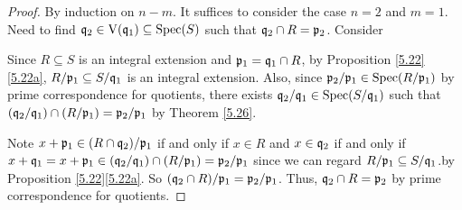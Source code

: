 \begin{proof}
    By induction on $n-m$. It suffices to consider the case $n = 2$ and $m = 1$. Need to find $\mathfrak{q}_2 \in \operatorname{V}(\mathfrak{q}_1) \subseteq \operatorname{Spec}(S)$ such that $\mathfrak{q}_2 \cap R = \mathfrak{p}_2$. Consider
    \begin{center}
    \end{center}
    Since $R \subseteq S$ is an integral extension and $\mathfrak{p}_1 = \mathfrak{q}_1 \cap R$, by Proposition \ref{5.22}\ref{5.22a}, $R/\mathfrak{p}_1 \subseteq S/\mathfrak{q}_1$ is an integral extension. Also, since $\mathfrak{p}_2/\mathfrak{p}_1 \in \operatorname{Spec}(R/\mathfrak{p}_1)$ by prime correspondence for quotients, there exists $\mathfrak{q}_2/\mathfrak{q}_1 \in \operatorname{Spec}(S/\mathfrak{q}_1)$ such that $(\mathfrak{q}_2/\mathfrak{q}_1) \cap (R/\mathfrak{p}_1) = \mathfrak{p}_2/\mathfrak{p}_1$ by Theorem \ref{5.26}. \par 
    Note $x + \mathfrak{p}_1 \in (R \cap \mathfrak{q}_2)/\mathfrak{p}_1$ if and only if $x \in R$ and $x \in \mathfrak{q}_2$ if and only if $x + \mathfrak{q}_1 = x + \mathfrak{p}_1 \in (\mathfrak{q}_2/\mathfrak{q}_1) \cap (R/\mathfrak{p}_1) = \mathfrak{p}_2/\mathfrak{p}_1$ since we can regard $R/\mathfrak{p}_1 \subseteq S/\mathfrak{q}_1$.by Proposition \ref{5.22}\ref{5.22a}. So $(\mathfrak{q}_2 \cap R)/\mathfrak{p}_1 = \mathfrak{p}_2/\mathfrak{p}_1$. Thus, $\mathfrak{q}_2 \cap R = \mathfrak{p}_2$ by prime correspondence for quotients.
\end{proof}

